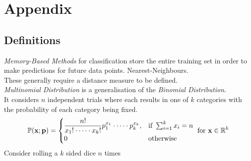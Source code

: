 \documentclass[11pt,a4paper]{article}
\begin{document}
\section{Appendix}

\subsection{Definitions}

\textit{Memory-Based Methods} for classification store the entire training set in order to make predictions for future data points. \eg Nearest-Neighbours.\\
\nb These generally require a distance measure to be defined.\\

\textit{Multinomial Distribution} is a generalisation of the \textit{Binomial Distribution}.\\
It considers $n$ independent trials where each results in one of $k$ categories with the probability of each category being fixed.\\
$$\mathbb{P}(\textbf{x};\textbf{p})=\begin{cases}\dfrac{n!}{x_1!\cdot\dots\cdot x_k!}p_1^{x_1}\cdot\dots\cdot p_k^{x_k},&\text{if }\sum_{i=1}^kx_i=n\\0&\text{otherwise}\end{cases}\text{ for }\textbf{x}\in\mathbb{R}^k$$
\nb Consider rolling a $k$ sided dice $n$ times
\end{document}
